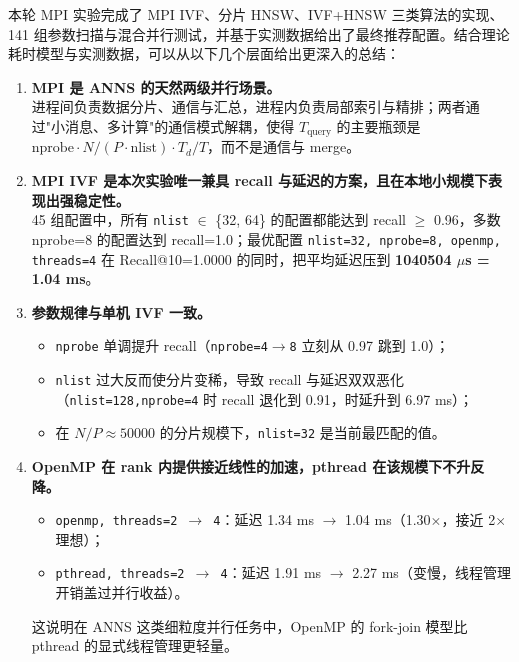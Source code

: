 \documentclass[a4paper]{article}
\begin{document}
本轮 MPI 实验完成了 MPI IVF、分片 HNSW、IVF+HNSW 三类算法的实现、141 组参数扫描与混合并行测试，并基于实测数据给出了最终推荐配置。结合理论耗时模型与实测数据，可以从以下几个层面给出更深入的总结：

\begin{enumerate}
    \item \textbf{MPI 是 ANNS 的天然两级并行场景。}\\
    进程间负责数据分片、通信与汇总，进程内负责局部索引与精排；两者通过"小消息、多计算"的通信模式解耦，使得 $T_{\text{query}}$ 的主要瓶颈是 $\text{nprobe} \cdot N/(P \cdot \text{nlist}) \cdot T_d / T$，而不是通信与 merge。

    \item \textbf{MPI IVF 是本次实验唯一兼具 recall 与延迟的方案，且在本地小规模下表现出强稳定性。}\\
    45 组配置中，所有 \texttt{nlist} $\in$ \{32, 64\} 的配置都能达到 recall $\geq$ 0.96，多数 nprobe=8 的配置达到 recall=1.0；最优配置 \texttt{nlist=32, nprobe=8, openmp, threads=4} 在 Recall@10=1.0000 的同时，把平均延迟压到 \textbf{1040504 $\mu$s = 1.04 ms}。

    \item \textbf{参数规律与单机 IVF 一致。}
    \begin{itemize}
        \item \texttt{nprobe} 单调提升 recall（\texttt{nprobe=4$\rightarrow$8} 立刻从 0.97 跳到 1.0）；
        \item \texttt{nlist} 过大反而使分片变稀，导致 recall 与延迟双双恶化（\texttt{nlist=128,nprobe=4} 时 recall 退化到 0.91，时延升到 6.97 ms）；
        \item 在 $N/P \approx 50000$ 的分片规模下，\texttt{nlist=32} 是当前最匹配的值。
    \end{itemize}

    \item \textbf{OpenMP 在 rank 内提供接近线性的加速，pthread 在该规模下不升反降。}
    \begin{itemize}
        \item \texttt{openmp, threads=2 $\rightarrow$ 4}：延迟 1.34 ms $\rightarrow$ 1.04 ms（1.30$\times$，接近 2$\times$ 理想）；
        \item \texttt{pthread, threads=2 $\rightarrow$ 4}：延迟 1.91 ms $\rightarrow$ 2.27 ms（变慢，线程管理开销盖过并行收益）。
    \end{itemize}
    这说明在 ANNS 这类细粒度并行任务中，OpenMP 的 fork-join 模型比 pthread 的显式线程管理更轻量。


\end{enumerate}
\end{document}
